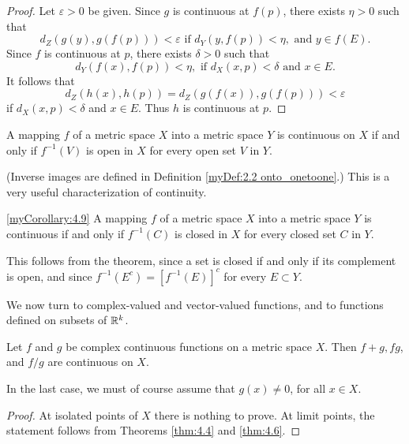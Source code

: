 \begin{proof}
    Let $\varepsilon > 0$ be given. Since $g$ is continuous at $f(p)$, there exists $\eta > 0$ such that 
    \begin{equation*}
        d_Z(g(y), g(f(p))) < \varepsilon \text{ if } d_Y(y,f(p)) < \eta, \text{ and } y \in f(E).
    \end{equation*}
Since $f$ is continuous at $p$, there exists $\delta > 0$ such that
\begin{equation*}
    d_Y(f(x),f(p)) < \eta, \text{ if } d_X(x, p) <\delta \text{ and } x \in E.
\end{equation*}
It follows that
\begin{equation*}
    d_Z(h(x), h(p)) = d_Z(g(f(x)), g(f(p))) < \varepsilon
\end{equation*}
if $d_X(x, p) < \delta$ and $x \in E$. Thus $h$ is continuous at $p$.
\end{proof}

\begin{thm}
    \label{thm:4.8}
    A mapping $f$ of a metric space $X$ into a metric space $Y$ is continuous on $X$ if and only if $f^{-1}(V)$ is open in $X$ for every open set $V$ in $Y$.
\end{thm}

(Inverse images are defined in Definition \ref{myDef:2.2 onto_onetoone}.) 
This is a very useful characterization of continuity.

\begin{myCorollary}
    \ref{myCorollary:4.9}
    A mapping $f$ of a metric space $X$ into a metric space $Y$ is continuous if and only if $f^{-1} (C)$ is closed in $X$ for every closed set $C$ in $Y$.
\end{myCorollary}

This follows from the theorem, since a set is closed if and only if its complement is open, and since $f^{-1}(E^c) = [f^{-1}(E)]^c$ for every $E \subset Y$.

We now turn to complex-valued and vector-valued functions, and to
functions defined on subsets of ${\protect\mathbb R}^{k}$.

\begin{thm}
    \label{thm:4.9}
    Let $f$ and $g$ be complex continuous functions on a metric space $X$.
    Then $f + g,fg$, and $f/g$ are continuous on $X$.
    
    In the last case, we must of course assume that $g(x) \neq 0$, for all $x \in  X$.
\end{thm}
\begin{proof}
    At isolated points of $X$ there is nothing to prove. At limit points,
    the statement follows from Theorems \ref{thm:4.4} and \ref{thm:4.6}.
\end{proof}

